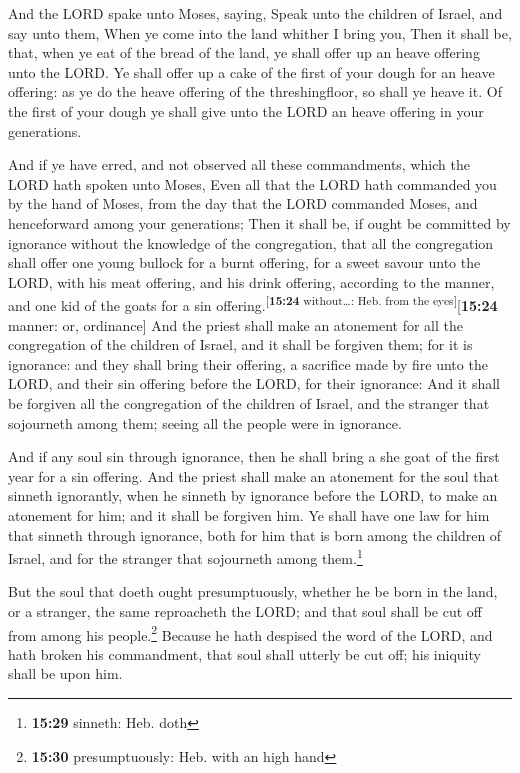  And the LORD spake unto Moses, saying, 
Speak unto the children of Israel, and say unto them, When ye come into
the land whither I bring you,  Then it shall be, that,
when ye eat of the bread of the land, ye shall offer up an heave
offering unto the LORD.  Ye shall offer up a cake of the
first of your dough for an heave offering: as ye do the heave offering
of the threshingfloor, so shall ye heave it.  Of the
first of your dough ye shall give unto the LORD an heave offering in
your generations.

 And if ye have erred, and not observed all these
commandments, which the LORD hath spoken unto Moses, 
Even all that the LORD hath commanded you by the hand of Moses, from the
day that the LORD commanded Moses, and henceforward among your
generations;  Then it shall be, if ought be committed by
ignorance without the knowledge of the congregation, that all the
congregation shall offer one young bullock for a burnt offering, for a
sweet savour unto the LORD, with his meat offering, and his drink
offering, according to the manner, and one kid of the goats for a sin
offering.\textsuperscript{{[}\textbf{15:24} without\ldots: Heb. from the
eyes{]}}{[}\textbf{15:24} manner: or, ordinance{]}  And
the priest shall make an atonement for all the congregation of the
children of Israel, and it shall be forgiven them; for it is ignorance:
and they shall bring their offering, a sacrifice made by fire unto the
LORD, and their sin offering before the LORD, for their ignorance:
 And it shall be forgiven all the congregation of the
children of Israel, and the stranger that sojourneth among them; seeing
all the people were in ignorance.

 And if any soul sin through ignorance, then he shall
bring a she goat of the first year for a sin offering. 
And the priest shall make an atonement for the soul that sinneth
ignorantly, when he sinneth by ignorance before the LORD, to make an
atonement for him; and it shall be forgiven him.  Ye
shall have one law for him that sinneth through ignorance, both for him
that is born among the children of Israel, and for the stranger that
sojourneth among them.\footnote{\textbf{15:29} sinneth: Heb. doth}

 But the soul that doeth ought presumptuously, whether he
be born in the land, or a stranger, the same reproacheth the LORD; and
that soul shall be cut off from among his people.\footnote{\textbf{15:30}
  presumptuously: Heb. with an high hand}  Because he
hath despised the word of the LORD, and hath broken his commandment,
that soul shall utterly be cut off; his iniquity shall be upon him.

